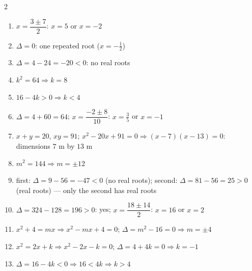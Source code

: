 \documentclass[11pt]{article}
\begin{document}
\begin{keybox}
\begin{multicols}{2}
\small
\begin{enumerate}[leftmargin=*,itemsep=3pt]
  \item $x=\dfrac{3\pm7}{2}$: $x=5$ or $x=-2$
  \item $\Delta=0$: one repeated root ($x=-\tfrac12$)
  \item $\Delta=4-24=-20<0$: no real roots
  \item $k^2=64\Rightarrow k=8$
  \item $16-4k>0\Rightarrow k<4$
  \item $\Delta=4+60=64$; $x=\dfrac{-2\pm8}{10}$: $x=\tfrac35$ or $x=-1$
  \item $x+y=20$, $xy=91$; $x^2-20x+91=0\Rightarrow(x-7)(x-13)=0$: dimensions $7$ m by $13$ m
  \item $m^2=144\Rightarrow m=\pm12$
  \item first: $\Delta=9-56=-47<0$ (no real roots); second: $\Delta=81-56=25>0$ (real roots) --- only the second has real roots
  \item $\Delta=324-128=196>0$: yes; $x=\dfrac{18\pm14}{2}$: $x=16$ or $x=2$
  \item $x^2+4=mx\Rightarrow x^2-mx+4=0$; $\Delta=m^2-16=0\Rightarrow m=\pm4$
  \item $x^2=2x+k\Rightarrow x^2-2x-k=0$; $\Delta=4+4k=0\Rightarrow k=-1$
  \item $\Delta=16-4k<0\Rightarrow16<4k\Rightarrow k>4$
\end{enumerate}
\end{multicols}
\end{keybox}
\end{document}
